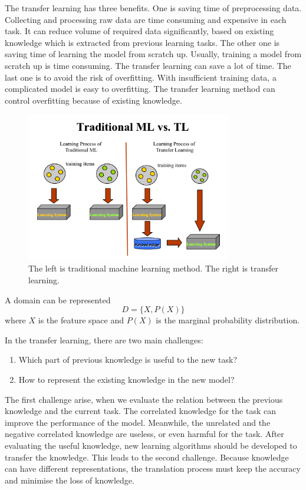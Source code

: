 The transfer learning has three benefits. One is saving time of preprocessing data. Collecting and processing raw data are time consuming and expensive in each task. It can reduce volume of required data significantly, based on existing knowledge which is extracted from previous learning tasks. The other one is saving time of learning the model from scratch up. Usually, training a model from scratch up is time consuming. The transfer learning can save a lot of time. The last one is to avoid the risk of overfitting. With insufficient training data, a complicated model is easy to overfitting. The transfer learning method can control overfitting because of existing knowledge.

\graphicspath{ {./Figures/} }
\begin{figure}[!htb]
\centering
\includegraphics[width=0.8\textwidth]{MLvsTL.png}
\caption{\label{fig:TransferLearning}The left is traditional machine learning method. The right is transfer learning\citep{TransferlearningDiagram}.}
\end{figure}

A domain can be represented
\begin{equation}\label{eq:TransLearning}
D = \{ X, P(X) \}
\end{equation}
where $X$ is the feature space and $P(X)$ is the marginal probability distribution. 

In the transfer learning, there are two main challenges: 
\begin{enumerate}
  \item Which part of previous knowledge is useful to the new task?
  \item How to represent the existing knowledge in the new model?
\end{enumerate}
The first challenge arise, when we evaluate the relation between the previous knowledge and the current task. The correlated knowledge for the task can improve the performance of the model. Meanwhile, the unrelated and the negative correlated knowledge are useless, or even harmful for the task. After evaluating the useful knowledge, new learning algorithms should be developed to transfer the knowledge. This leads to the second challenge. Because knowledge can have different representations, the translation process must keep the accuracy and minimise the loss of knowledge. 